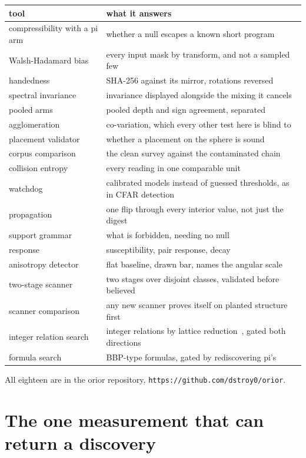 \begin{center}
\begin{tabular}{@{}ll@{}}
\toprule
tool & what it answers \\
\midrule
compressibility with a pi arm & whether a null escapes a known short program \\
Walsh-Hadamard bias & every input mask by transform, and not a sampled few \\
handedness & SHA-256 against its mirror, rotations reversed \\
spectral invariance & invariance displayed alongside the mixing it cancels \\
pooled arms & pooled depth and sign agreement, separated \\
agglomeration & co-variation, which every other test here is blind to \\
placement validator & whether a placement on the sphere is sound \\
corpus comparison & the clean survey against the contaminated chain \\
collision entropy & every reading in one comparable unit \\
watchdog & calibrated models instead of guessed thresholds, as in CFAR detection~\cite{src:Rohling-1983} \\
propagation & one flip through every interior value, not just the digest \\
support grammar & what is forbidden, needing no null \\
response & susceptibility, pair response, decay \\
anisotropy detector & flat baseline, drawn bar, names the angular scale \\
two-stage scanner & two stages over disjoint classes, validated before believed \\
scanner comparison & any new scanner proves itself on planted structure first \\
integer relation search & integer relations by lattice reduction~\cite{src:LLL-1982}, gated both directions \\
formula search & BBP-type formulas, gated by rediscovering pi's \\
\bottomrule
\end{tabular}
\end{center}

All eighteen are in the orior repository, \texttt{https://github.com/dstroy0/orior}.

\section{The one measurement that can return a discovery}

